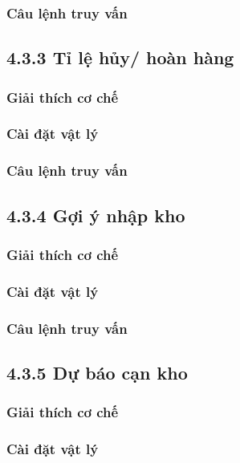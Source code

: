 \subsubsection{Câu lệnh truy vấn}

\subsection{4.3.3 Tỉ lệ hủy/ hoàn hàng}

\subsubsection{Giải thích cơ chế}

\subsubsection{Cài đặt vật lý}

\subsubsection{Câu lệnh truy vấn}

\subsection{4.3.4 Gợi ý nhập kho}

\subsubsection{Giải thích cơ chế}

\subsubsection{Cài đặt vật lý}

\subsubsection{Câu lệnh truy vấn}

\subsection{4.3.5 Dự báo cạn kho}

\subsubsection{Giải thích cơ chế}

\subsubsection{Cài đặt vật lý}

